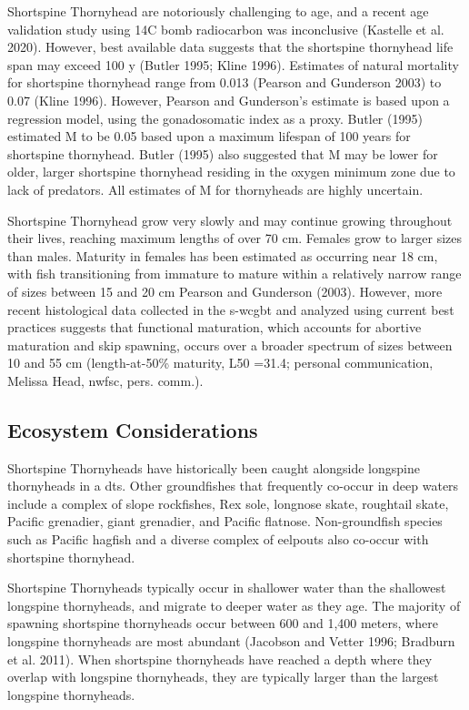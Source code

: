 \documentclass[11pt,
  english,
  letterpaper,
]{article}
\begin{document}
Shortspine Thornyhead are notoriously challenging to age, and a recent age validation study using 14C bomb radiocarbon was inconclusive (Kastelle et al. 2020). However, best available data suggests that the shortspine thornyhead life span may exceed 100 y (Butler 1995; Kline 1996). Estimates of natural mortality for shortspine thornyhead range from 0.013 (Pearson and Gunderson 2003) to 0.07 (Kline 1996). However, Pearson and Gunderson's estimate is based upon a regression model, using the gonadosomatic index as a proxy. Butler (1995) estimated M to be 0.05 based upon a maximum lifespan of 100 years for shortspine thornyhead. Butler (1995) also suggested that M may be lower for older, larger shortspine thornyhead residing in the oxygen minimum zone due to lack of predators. All estimates of M for thornyheads are highly uncertain.

Shortspine Thornyhead grow very slowly and may continue growing throughout their lives, reaching maximum lengths of over 70 cm. Females grow to larger sizes than males. Maturity in females has been estimated as occurring near 18 cm, with fish transitioning from immature to mature within a relatively narrow range of sizes between 15 and 20 cm Pearson and Gunderson (2003). However, more recent histological data collected in the \gls{s-wcgbt} and analyzed using current best practices suggests that functional maturation, which accounts for abortive maturation and skip spawning, occurs over a broader spectrum of sizes between 10 and 55 cm (length-at-50\% maturity, L50 =31.4; personal communication, Melissa Head, \gls{nwfsc}, pers. comm.).

\hypertarget{ecosystem-considerations-1}{%
\subsection{Ecosystem Considerations}\label{ecosystem-considerations-1}}

Shortspine Thornyheads have historically been caught alongside longspine thornyheads in a \gls{dts}. Other groundfishes that frequently co-occur in deep waters include a complex of slope rockfishes, Rex sole, longnose skate, roughtail skate, Pacific grenadier, giant grenadier, and Pacific flatnose. Non-groundfish species such as Pacific hagfish and a diverse complex of eelpouts also co-occur with shortspine thornyhead.

Shortspine Thornyheads typically occur in shallower water than the shallowest longspine thornyheads, and migrate to deeper water as they age. The majority of spawning shortspine thornyheads occur between 600 and 1,400 meters, where longspine thornyheads are most abundant (Jacobson and Vetter 1996; Bradburn et al. 2011). When shortspine thornyheads have reached a depth where they overlap with longspine thornyheads, they are typically larger than the largest longspine thornyheads.
\end{document}
